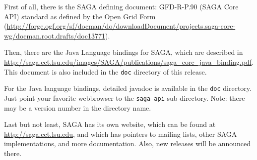 \documentclass[a4paper,10pt]{article}
\begin{document}
First of all, there is the SAGA defining document:
GFD-R-P.90 (SAGA Core API) standard as defined by the
Open Grid Form (\url{http://forge.ogf.org/sf/docman/do/downloadDocument/projects.saga-core-wg/docman.root.drafts/doc13771}).

Then, there are the Java Language bindings for SAGA, which
are described in \url{http://saga.cct.lsu.edu/images/SAGA/publications/saga_core_java_binding.pdf}. This document is also included in the
\texttt{doc} directory of this release.

For the Java language bindings, detailed javadoc is available
in the \texttt{doc} directory. Just point your favorite webbrowser
to the \texttt{saga-api} sub-directory. Note: there may be a version
number in the directory name.

Last but not least, SAGA has its own website,
which can be found at \url{http://saga.cct.lsu.edu},
and which has pointers to mailing lists, other SAGA implementations,
and more documentation. Also, new releases will be announced there.
\end{document}
